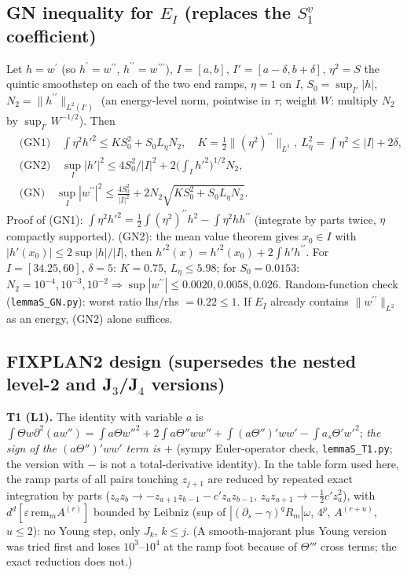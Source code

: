 \documentclass[11pt]{article}
\begin{document}
\subsection*{GN inequality for $E_I$ (replaces the $S_1^v$ coefficient)}
Let $h=w^{\prime}$ (so $h^{\prime}=w^{\prime\prime}$, $h^{\prime\prime}=w^{\prime\prime\prime}$), $I=[a,b]$, $I'=[a-\delta,b+\delta]$, $\eta^2=S$ the quintic smoothstep on each of the two end ramps, $\eta=1$ on $I$, $S_0=\sup_{I'}|h|$, $N_2=\|h^{\prime\prime}\|_{L^2(I')}$ (an energy-level norm, pointwise in $\tau$; weight $W$: multiply $N_2$ by $\sup_{I'}W^{-1/2}$). Then
\begin{align*}
&\text{(GN1)}\quad \textstyle\int\eta^2h'^2\le K S_0^2+S_0L_\eta N_2,\quad K=\tfrac12\|(\eta^2)^{\prime\prime}\|_{L^1},\ L_\eta^2=\int\eta^2\le |I|+2\delta,\\
&\text{(GN2)}\quad \sup_I|h'|^2\le 4S_0^2/|I|^2+2\big(\textstyle\int_Ih'^2\big)^{1/2}N_2,\\
&\text{(GN)}\quad \sup_I|w^{\prime\prime}|^2\le \frac{4S_0^2}{|I|^2}+2N_2\sqrt{KS_0^2+S_0L_\eta N_2}.
\end{align*}
Proof of (GN1): $\int\eta^2h'^2=\tfrac12\int(\eta^2)^{\prime\prime}h^2-\int\eta^2hh^{\prime\prime}$ (integrate by parts twice, $\eta$ compactly supported). (GN2): the mean value theorem gives $x_0\in I$ with $|h'(x_0)|\le2\sup|h|/|I|$, then $h'^2(x)=h'^2(x_0)+2\int h'h^{\prime\prime}$. For $I=[34.25,60]$, $\delta=5$: $K=0.75$, $L_\eta\le5.98$; for $S_0=0.0153$: $N_2=10^{-4},10^{-3},10^{-2}\Rightarrow\sup|w^{\prime\prime}|\le0.0020,0.0058,0.026$. Random-function check (\texttt{lemmaS\_GN.py}): worst ratio lhs/rhs $=0.22\le1$. If $E_I$ already contains $\|w^{\prime\prime}\|_{L^2}$ as an energy, (GN2) alone suffices.
\subsection*{FIXPLAN2 design (supersedes the nested level-2 and J$_3$/J$_4$ versions)}
\textbf{T1 (L1).} The identity with variable $a$ is $\int\Theta w\partial^2(aw'')=\int a\Theta w''^2+2\int a\Theta''ww''+\int(a\Theta'')'ww'-\int a_s\Theta'w'^2$; \emph{the sign of the $(a\Theta'')'ww'$ term is $+$} (sympy Euler-operator check, \texttt{lemmaS\_T1.py}; the version with $-$ is not a total-derivative identity). In the table form used here, the ramp parts of all pairs touching $z_{j+1}$ are reduced by repeated exact integration by parts ($z_az_b\to-z_{a+1}z_{b-1}-c'z_az_{b-1}$, $z_az_{a+1}\to-\tfrac12c'z_a^2$), with $d^d[\varepsilon\,\mathrm{rem}_m A^{(r)}]$ bounded by Leibniz (sup of $|(\partial_s-\gamma)^qR_m|\omega$, $4^p$, $A^{(r+u)}$, $u\le2$): no Young step, only $J_k$, $k\le j$. (A smooth-majorant plus Young version was tried first and loses $10^3$--$10^4$ at the ramp foot because of $\Theta'''$ cross terms; the exact reduction does not.)
\end{document}
